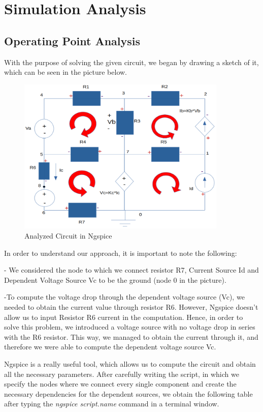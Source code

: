 \documentclass[11en, a4paper, oneside]{article}
\begin{document}
\newpage
\section{Simulation Analysis}
\label{simuanal}
\subsection{Operating Point Analysis}
With the purpose of solving the given circuit, we began by drawing a sketch of it, which can be seen in the picture below.

\begin{figure}[htb!]
			\begin{center}
				\includegraphics[width=10cm]{Simulacao.png}
				\caption{Analyzed Circuit in Ngspice}
			\end{center}
\end{figure}

In order to understand our approach, it is important to note the following:

- We considered the node to which we connect resistor R7, Current Source Id and Dependent Voltage Source Vc to be the ground (node 0 in the picture).

-To compute the voltage drop through the dependent voltage source (Vc), we needed to obtain the current value through resistor R6. However, Ngspice doesn't allow us to input Resistor R6 current in the computation. Hence, in order to solve this problem, we introduced a voltage source with no voltage drop in series with the R6 resistor. This way, we managed to obtain the current through it, and therefore we were able to compute the dependent voltage source Vc.

Ngspice is a really useful tool, which allows us to compute the circuit and obtain all the necessary parameters. After carefully writing the script, in which we specify the nodes where we connect every single component and create the necessary dependencies for the dependent sources, we obtain the following table after typing the \textit{ngspice script.name} command in a terminal window.
\end{document}
